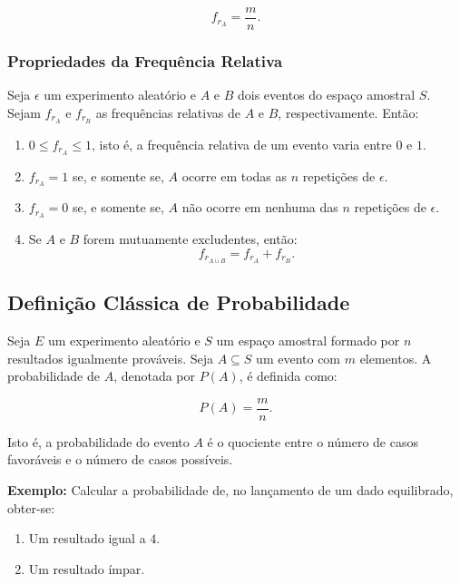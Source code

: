 \begin{equation}
     f_{r_A}= \frac{m}{n}.
\end{equation}

\subsubsection{Propriedades da Frequência Relativa} 

Seja $\epsilon$ um experimento aleatório e $A$ e $B$ dois eventos do espaço amostral $S$. Sejam $f_{r_A}$ e $f_{r_B}$ as frequências relativas de $A$ e $B$, respectivamente. Então:

\begin{enumerate}
    \item $0 \leqslant f_{r_A} \leqslant 1$, isto é, a frequência relativa de um evento varia entre $0$ e $1$.
    
    \item $f_{r_A}=1$ se, e somente se, $A$ ocorre em todas as $n$ repetições de $\epsilon$.
    
    \item $f_{r_A}=0$ se, e somente se, $A$ não ocorre em nenhuma das $n$ repetições de $\epsilon$.
    
    \item Se $A$ e $B$ forem mutuamente excludentes, então:
    \[
    f_{r_{A \cup B}} = f_{r_A} + f_{r_B}.
    \]
\end{enumerate}


\subsection{Definição Clássica de Probabilidade}
 

Seja $E$ um experimento aleatório e $S$ um espaço amostral formado por $n$ resultados igualmente prováveis. Seja $A \subseteq S$ um evento com $m$ elementos. A probabilidade de $A$, denotada por $P(A)$, é definida como:

\begin{equation}
     P(A)= \frac{m}{n}.
\end{equation}
  
Isto é, a probabilidade do evento $A$ é o quociente entre o número de casos favoráveis e o número de casos possíveis.\vskip0.3cm

\textbf{Exemplo:} Calcular a probabilidade de, no lançamento de um dado equilibrado, obter-se:

\begin{enumerate}
    \item Um resultado igual a $4$.
    \item Um resultado ímpar.
\end{enumerate}


